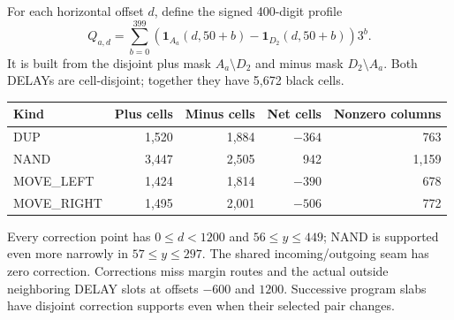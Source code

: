\documentclass[11pt,letterpaper]{article}
\theoremstyle{definition}\newtheorem{definition}[theorem]{Definition}
\theoremstyle{remark}\newtheorem{remark}[theorem]{Remark}
\newcommand{\ind}{\mathbf 1}\newcommand{\dom}{\operatorname{dom}}
\begin{document}
For each horizontal offset $d$, define the signed 400-digit profile
\begin{equation}\label{ptr:sc:eq:q}
 Q_{a,d}=\sum_{b=0}^{399}\left(\ind_{A_a}(d,50+b)-\ind_{D_2}(d,50+b)\right)3^b.
\end{equation}
It is built from the disjoint plus mask $A_a\setminus D_2$ and minus mask $D_2\setminus A_a$. Both DELAYs are cell-disjoint; together they have 5,672 black cells.
\begin{center}
\begin{tabular}{@{}lrrrr@{}}\toprule
Kind&Plus cells&Minus cells&Net cells&Nonzero columns\\\midrule
DUP&1,520&1,884&$-364$&763\\
NAND&3,447&2,505&942&1,159\\
MOVE\_LEFT&1,424&1,814&$-390$&678\\
MOVE\_RIGHT&1,495&2,001&$-506$&772\\\bottomrule
\end{tabular}\end{center}
Every correction point has $0\le d<1200$ and $56\le y\le449$; NAND is supported even more narrowly in $57\le y\le297$. The shared incoming/outgoing seam has zero correction. Corrections miss margin routes and the actual outside neighboring DELAY slots at offsets $-600$ and $1200$. Successive program slabs have disjoint correction supports even when their selected pair changes.
\end{document}
